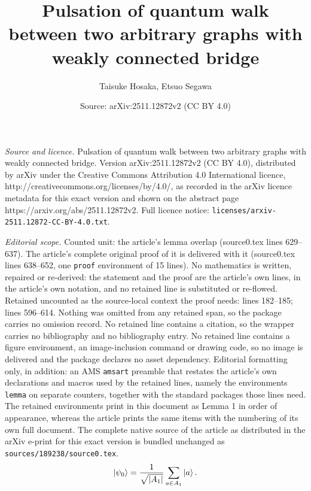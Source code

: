 \documentclass[10pt,a4paper]{amsart}
\title{Pulsation of quantum walk between two arbitrary graphs with weakly connected bridge}
\author{Taisuke Hosaka, Etsuo Segawa}
\date{Source: arXiv:2511.12872v2 (CC BY 4.0)}
\begin{document}
\maketitle

\noindent\emph{Source and licence.} Pulsation of quantum walk between two arbitrary graphs with weakly connected bridge. Version arXiv:2511.12872v2 (CC BY 4.0), distributed by arXiv under the Creative Commons Attribution 4.0 International licence, http://creativecommons.org/licenses/by/4.0/, as recorded in the arXiv licence metadata for this exact version and shown on the abstract page https://arxiv.org/abs/2511.12872v2. Full licence notice: \texttt{licenses/arxiv-2511.12872-CC-BY-4.0.txt}.\par\smallskip

\noindent\textit{Editorial scope.} Counted unit: the article's lemma overlap (source0.tex lines 629--637). The article's complete original proof of it is delivered with it (source0.tex lines 638--652, one \texttt{proof} environment of 15 lines). No mathematics is written, repaired or re-derived: the statement and the proof are the article's own lines, in the article's own notation, and no retained line is substituted or re-flowed.  Retained uncounted as the source-local context the proof needs: lines 182--185; lines 596--614.  Nothing was omitted from any retained span, so the package carries no omission record.  No retained line contains a citation, so the wrapper carries no bibliography and no bibliography entry.  No retained line contains a figure environment, an image-inclusion command or drawing code, so no image is delivered and the package declares no asset dependency.  Editorial formatting only, in addition: an AMS \texttt{amsart} preamble that restates the article's own declarations and macros used by the retained lines, namely the environments \texttt{lemma} on separate counters, together with the standard packages those lines need.  The retained environments print in this document as Lemma 1 in order of appearance, whereas the article prints the same items with the numbering of its own full document.  The complete native source of the article as distributed in the arXiv e-print for this exact version is bundled unchanged as \texttt{sources/189238/source0.tex}.
\begin{align}
    \label{eq: initial state}
    \ket{\psi_0}=\frac{1}{\sqrt{|A_1|}}\sum_{a\in A_1}\ket{a}.
\end{align}
\end{document}
